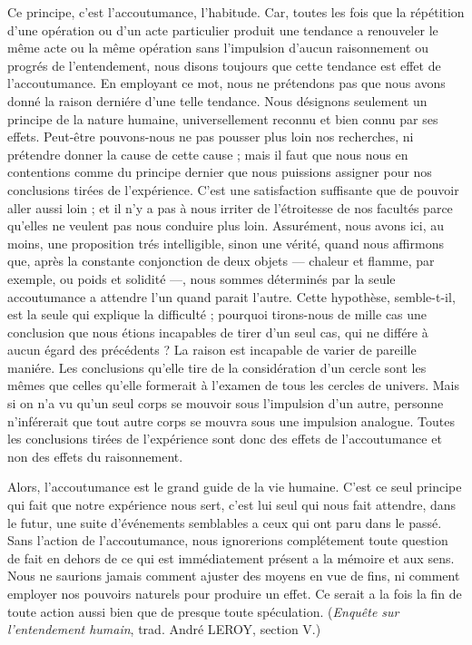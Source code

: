 Ce principe, c’est l'accoutumance, l’habitude. Car,
toutes les fois que la répétition d’une opération ou d’un
acte particulier produit une tendance a renouveler le
même acte ou la même opération sans l’impulsion d’aucun
raisonnement ou progrés de l’entendement, nous disons
toujours que cette tendance est effet de l’accoutumance.
En employant ce mot, nous ne prétendons pas que nous
avons donné la raison derniére d’une telle tendance.
Nous désignons seulement un principe de la nature
humaine, universellement reconnu et bien connu par ses
effets. Peut-être pouvons-nous ne pas pousser plus loin
nos recherches, ni prétendre donner la cause de cette
cause ; mais il faut que nous nous en contentions comme
du principe dernier que nous puissions assigner pour nos
conclusions tirées de l’expérience. C’est une satisfaction
suffisante que de pouvoir aller aussi loin ; et il n’y a pas
à nous irriter de l’étroitesse de nos facultés parce qu’elles
ne veulent pas nous conduire plus loin. Assurément, nous
avons ici, au moins, une proposition trés intelligible,
sinon une vérité, quand nous affirmons que, après la
constante conjonction de deux objets — chaleur et flamme,
par exemple, ou poids et solidité —, nous sommes déterminés
par la seule accoutumance a attendre l’un quand
parait l’autre. Cette hypothèse, semble-t-il, est la seule
qui explique la difficulté ; pourquoi tirons-nous de mille
cas une conclusion que nous étions incapables de tirer
d’un seul cas, qui ne différe à aucun égard des précédents ?
La raison est incapable de varier de pareille maniére. Les
conclusions qu’elle tire de la considération d’un cercle
sont les mêmes que celles qu’elle formerait à l’examen de
tous les cercles de univers. Mais si on n’a vu qu’un seul
corps se mouvoir sous l’impulsion d’un autre, personne
n’inférerait que tout autre corps se mouvra sous une
impulsion analogue. Toutes les conclusions tirées de
l'expérience sont donc des effets de l'accoutumance et
non des effets du raisonnement.

Alors, l'accoutumance est le grand guide de la vie
humaine. C’est ce seul principe qui fait que notre expérience
nous sert, c’est lui seul qui nous fait attendre, dans
le futur, une suite d’événements semblables a ceux qui ont
paru dans le passé. Sans l’action de l’accoutumance, nous
ignorerions complétement toute question de fait en dehors
de ce qui est immédiatement présent a la mémoire et aux
sens. Nous ne saurions jamais comment ajuster des moyens
en vue de fins, ni comment employer nos pouvoirs naturels
pour produire un effet. Ce serait a la fois la fin de toute
action aussi bien que de presque toute spéculation. ({\it Enquête
sur l’entendement humain}, trad. André L{\footnotesize EROY}, section V.)

